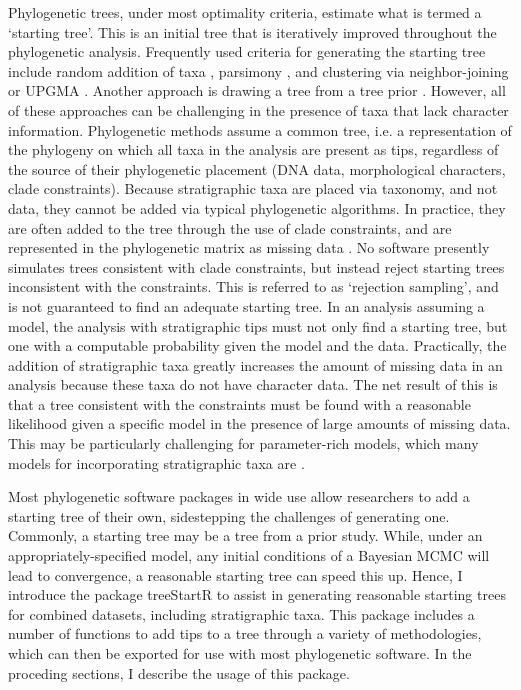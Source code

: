\documentclass[11pt]{article}
\begin{document}
Phylogenetic trees, under most optimality criteria, estimate what is termed a `starting tree'. 
This is an initial tree that is iteratively improved throughout the phylogenetic analysis.
Frequently used criteria for generating the starting tree include random addition of taxa \citep[]{raxml8, beast2}, parsimony \citep{raxml8}, and clustering via neighbor-joining or UPGMA \citep{beast2}.
Another approach is drawing a tree from a tree prior \citep{Hoehna2014b, Hoehna2017a}.
However, all of these approaches can be challenging in the presence of taxa that lack character information. 
Phylogenetic methods assume a common tree, i.e. a representation of the phylogeny on which all taxa in the analysis are present as tips, regardless of the source of their phylogenetic placement (DNA data, morphological characters, clade constraints).
Because stratigraphic taxa are placed via taxonomy, and not data, they cannot be added via typical phylogenetic algorithms.
In practice, they are often added to the tree through the use of clade constraints, and are represented in the phylogenetic matrix as missing data \citep{Hoehna2014b, Hoehna2017a}.
No software presently simulates trees consistent with clade constraints, but instead reject starting trees inconsistent with the constraints.
This is referred to as `rejection sampling', and is not guaranteed to find an adequate starting tree.
In an analysis assuming a model, the analysis with stratigraphic tips must not only find a starting tree, but one with a computable probability given the model and the data.
Practically, the addition of stratigraphic taxa greatly increases the amount of missing data in an analysis because these taxa do not have character data.
The net result of this is that a tree consistent with the constraints must be found with a reasonable likelihood given a specific model in the presence of large amounts of missing data.
This may be particularly challenging for parameter-rich models, which many models for incorporating stratigraphic taxa are \citep{Heath2014}. \par

Most phylogenetic software packages in wide use allow researchers to add a starting tree of their own, sidestepping the challenges of generating one. 
Commonly, a starting tree may be a tree from a prior study. 
While, under an appropriately-specified model, any initial conditions of a Bayesian MCMC will lead to convergence, a reasonable starting tree can speed this up.
Hence, I introduce the package treeStartR to assist in generating reasonable starting trees for combined datasets, including stratigraphic taxa.
This package includes a number of functions to add tips to a tree through a variety of methodologies, which can then be exported for use with most phylogenetic software.
In the proceding sections, I describe the usage of this package.
\end{document}
